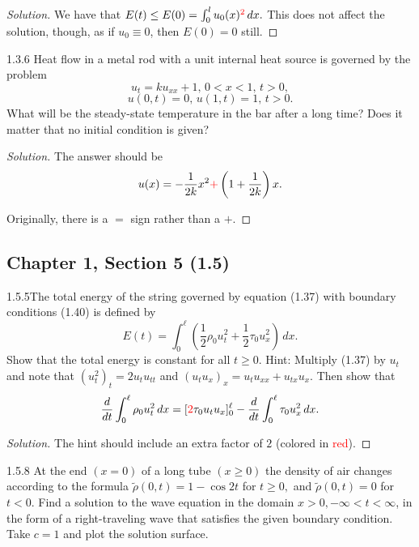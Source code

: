 \documentclass[11pt]{article}
\newenvironment{solution}
  {\renewcommand\qedsymbol{$\blacksquare$}\begin{proof}[Solution]}
  {\end{proof}}
\theoremstyle{definition}
\begin{document}
\begin{solution}
We have that $E(t) \leq E(0) = \int_0^l u_0(x)^{\textcolor{red}{2}} \, dx.$ This does not affect the solution, though, as if $u_0 \equiv 0$, then $E(0) = 0$ still.

\end{solution}

\begin{exercise}{1.3.6}
Heat flow in a metal rod with a unit internal heat source is governed by the problem
\[u_t=ku_{xx}+1, \, 0<x<1, \, t>0, \]
\[u(0,t)=0, \, u(1,t)=1, \, t>0. \]
What will be the steady-state temperature in the bar after a long time? Does it matter that no initial condition is given?
\end{exercise}

\begin{solution}
  The answer should be \[u(x) = -\frac{1}{2k}x^2 \textcolor{red}{+} \left(1+\frac{1}{2k}\right) x.\]

  Originally, there is a $=$ sign rather than a $+$.
\end{solution}

\setcounter{subsection}{4}
\subsection{Chapter 1, Section 5 (1.5)}

\begin{exercise}{1.5.5}The total energy of the string governed by equation (1.37) with boundary conditions (1.40) is defined by \[E(t) = \int_{0}^{\ell} \left( \frac{1}{2} \rho_0 u_t^2 + \frac{1}{2} \tau_0 u_x^2 \right) \, dx.\]
Show that the total energy is constant for all $ t \geq 0$. Hint: Multiply (1.37) by $u_t$ and note that $(u_t^2)_t = 2u_tu_{tt}$ and $(u_tu_x)_x = u_tu_{xx} + u_{tx}u_x.$ Then
show that \[\frac{d}{dt} \int_{0}^{\ell} \rho_0 u_t^2 \, dx= [\textcolor{red}{2}\tau_0u_tu_x]_0^\ell - \frac{d}{dt}  \int_{0}^{\ell} \tau_0 u_x^2 \, dx.\]
\end{exercise}

\begin{solution}
The hint should include an extra factor of $2$ (colored in \textcolor{red}{red}).
\end{solution}

\begin{exercise}{1.5.8}
  At the end $(x = 0)$ of a long tube $(x \geq 0)$ the density of air changes according to the formula $\tilde{\rho}(0,t) = 1 - \cos 2t$ for $t \geq 0,$ 
  and $\tilde{\rho}(0,t) = 0$ for $t < 0$. Find a solution to the wave equation in the domain $x>0, -\infty<t< \infty$, in the form of a 
  right-traveling wave that satisfies the given boundary condition. Take $c = 1$ and plot the solution surface.
\end{exercise}
\end{document}
